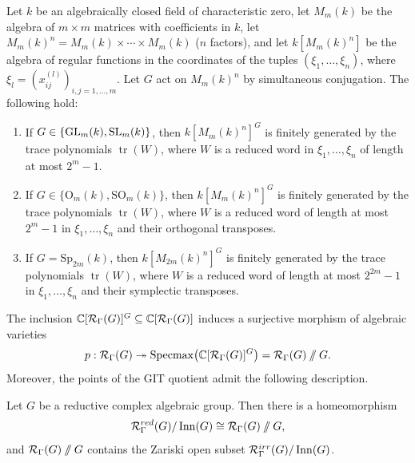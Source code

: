 \begin{theorem}[Procesi]
    Let $k$ be an algebraically closed field of characteristic zero, let $M_m(k)$ be the algebra of $m \times m$ matrices with coefficients in $k$, let $M_m(k)^n = M_m(k) \times \cdots \times M_m(k)$ ($n$ factors), and let $k[M_m(k)^n]$ be the algebra of regular functions in the coordinates of the tuples $(\xi_1, \dots, \xi_n)$, where $\xi_l = (x^{(l)}_{ij})_{i,j=1,\dots,m}$. Let $G$ act on $M_m(k)^n$ by simultaneous conjugation. The following hold:
    \begin{enumerate}
        \item If $G \in \{\operatorname{GL}_m(k), \operatorname{SL}_m(k)\}$, then $k[M_m(k)^n]^G$ is finitely generated by the trace polynomials $\operatorname{tr}(W)$, where $W$ is a reduced word in $\xi_1, \dots, \xi_n$ of length at most $2^m - 1$.
        \item If $G \in \{\mathrm{O}_m(k), \mathrm{SO}_m(k)\}$, then $k[M_m(k)^n]^G$ is finitely generated by the trace polynomials $\operatorname{tr}(W)$, where $W$ is a reduced word of length at most $2^m - 1$ in $\xi_1, \dots, \xi_n$ and their orthogonal transposes.
        \item If $G = \mathrm{Sp}_{2m}(k)$, then $k[M_{2m}(k)^n]^G$ is finitely generated by the trace polynomials $\operatorname{tr}(W)$, where $W$ is a reduced word of length at most $2^{2m} - 1$ in $\xi_1, \dots, \xi_n$ and their symplectic transposes.
    \end{enumerate}
\end{theorem}


The inclusion $\CC[\RepVar{\Gamma}{G}]^G \subseteq \CC[\RepVar{\Gamma}{G}]$ induces a surjective morphism of algebraic varieties
\[
    p : \RepVar{\Gamma}{G} \twoheadrightarrow \Specmax\bigl(\CC[\RepVar{\Gamma}{G}]^G\bigr) = \RepVar{\Gamma}{G} \git G.
\]
Moreover, the points of the GIT quotient admit the following description.

\begin{theorem}
    Let $G$ be a reductive complex algebraic group. Then there is a homeomorphism
    \[
        \RepVar{\Gamma}{G}[red] / \Inn(G) \cong \RepVar{\Gamma}{G} \git G,
    \]
    and $\RepVar{\Gamma}{G} \git G$ contains the Zariski open subset $\RepVar{\Gamma}{G}[irr] / \Inn(G)$.
\end{theorem}

